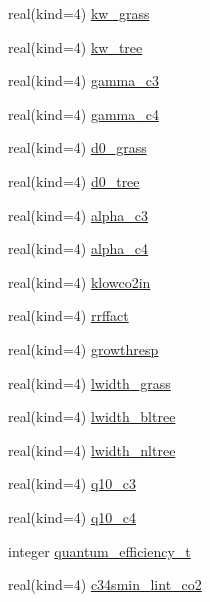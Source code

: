 \begin{DoxyCompactItemize}
\item 
real(kind=4) \hyperlink{namespacephysiology__coms_a5851785d443262ca4a05d4a8ba0668c9}{kw\+\_\+grass}
\item 
real(kind=4) \hyperlink{namespacephysiology__coms_a840f4a14063bfd729e0882aa41a6196b}{kw\+\_\+tree}
\item 
real(kind=4) \hyperlink{namespacephysiology__coms_a1047d70553211a06c4db8b3b91ac9a5a}{gamma\+\_\+c3}
\item 
real(kind=4) \hyperlink{namespacephysiology__coms_a0fb188e6eb592e66650e7469f3526a2e}{gamma\+\_\+c4}
\item 
real(kind=4) \hyperlink{namespacephysiology__coms_a8bb7a49b5a368f444b440a6878908c54}{d0\+\_\+grass}
\item 
real(kind=4) \hyperlink{namespacephysiology__coms_af966fde8e82305bfc1939ab7548ba424}{d0\+\_\+tree}
\item 
real(kind=4) \hyperlink{namespacephysiology__coms_a3fa7397dce5d85afa000532d34a4f7e1}{alpha\+\_\+c3}
\item 
real(kind=4) \hyperlink{namespacephysiology__coms_a5b916ce98d80dbff5597fd7e218d35f7}{alpha\+\_\+c4}
\item 
real(kind=4) \hyperlink{namespacephysiology__coms_ae6137ce76e93cc9c6986bd1641276b83}{klowco2in}
\item 
real(kind=4) \hyperlink{namespacephysiology__coms_a0cce0fce32e96abbe4ab367ae4fd4578}{rrffact}
\item 
real(kind=4) \hyperlink{namespacephysiology__coms_a5575f4930196b79858fdc164b6d0bd21}{growthresp}
\item 
real(kind=4) \hyperlink{namespacephysiology__coms_aa11c93814b8de74595fe8516e0d901c1}{lwidth\+\_\+grass}
\item 
real(kind=4) \hyperlink{namespacephysiology__coms_a3f61c909c2342759478b025ea41f3125}{lwidth\+\_\+bltree}
\item 
real(kind=4) \hyperlink{namespacephysiology__coms_ac742bd74ce70f657609660f309eb9853}{lwidth\+\_\+nltree}
\item 
real(kind=4) \hyperlink{namespacephysiology__coms_aebfbdd7137fa93ba69de3a2ea7936c50}{q10\+\_\+c3}
\item 
real(kind=4) \hyperlink{namespacephysiology__coms_a58329d760ae671f7fa6b1b1854bd3bce}{q10\+\_\+c4}
\item 
integer \hyperlink{namespacephysiology__coms_acc7c98056c927d22975df63295e7d8eb}{quantum\+\_\+efficiency\+\_\+t}
\item 
real(kind=4) \hyperlink{namespacephysiology__coms_aff3389c10c3252e32b514150d2d601ee}{c34smin\+\_\+lint\+\_\+co2}

\end{DoxyCompactItemize}
